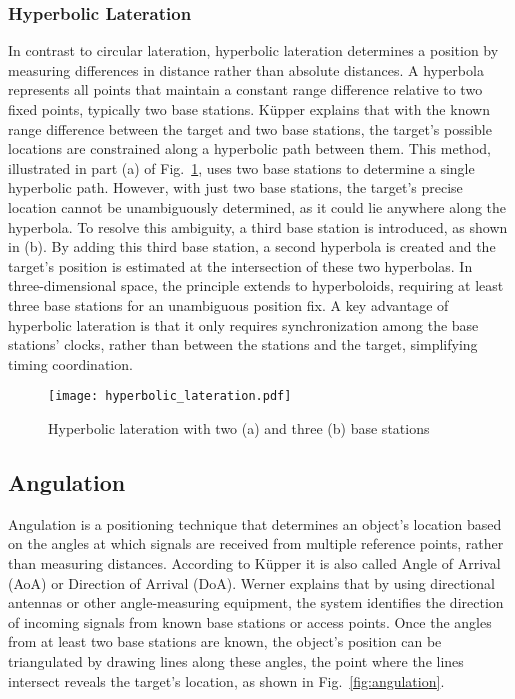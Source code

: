 \subsubsection{Hyperbolic Lateration}
In contrast to circular lateration, hyperbolic lateration determines a position by measuring differences in distance rather than absolute distances. A hyperbola represents all points that maintain a constant range difference relative to two fixed points, typically two base stations. K\"upper \cite{kupper2005location} explains that with the known range difference between the target and two base stations, the target's possible locations are constrained along a hyperbolic path between them. This method, illustrated in part (a) of Fig.~\ref{fig:hyperbolic_lateration}, uses two base stations to determine a single hyperbolic path. However, with just two base stations, the target's precise location cannot be unambiguously determined, as it could lie anywhere along the hyperbola.
To resolve this ambiguity, a third base station is introduced, as shown in (b). By adding this third base station, a second hyperbola is created and the target's position is estimated at the intersection of these two hyperbolas. In three-dimensional space, the principle extends to hyperboloids, requiring at least three base stations for an unambiguous position fix. A key advantage of hyperbolic lateration is that it only requires synchronization among the base stations' clocks, rather than between the stations and the target, simplifying timing coordination.

\begin{figure}[htbp]
    \centering
    \texttt{[image: hyperbolic\_lateration.pdf]}
    \caption{Hyperbolic lateration with two (a) and three (b) base stations \cite{kupper2005location}}
    \label{fig:hyperbolic_lateration}
\end{figure}

\subsection{Angulation}
Angulation is a positioning technique that determines an object's location based on the angles at which signals are received from multiple reference points, rather than measuring distances. According to K\"upper \cite{kupper2005location} it is also called Angle of Arrival (AoA) or Direction of Arrival (DoA). Werner \cite{werner2014indoor} explains that by using directional antennas or other angle-measuring equipment, the system identifies the direction of incoming signals from known base stations or access points. Once the angles from at least two base stations are known, the object's position can be triangulated by drawing lines along these angles, the point where the lines intersect reveals the target's location, as shown in Fig.~\ref{fig:angulation}.

